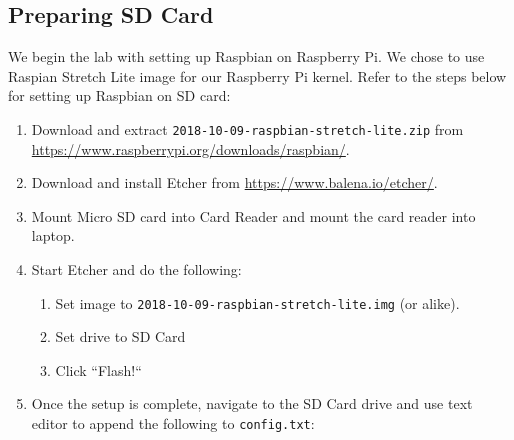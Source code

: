 \documentclass[onecolumn, draftclsnofoot, 10pt, compsoc]{IEEEtran}
\begin{document}
\subsection{Preparing SD Card}
We begin the lab with setting up Raspbian on Raspberry Pi. We chose to use Raspian Stretch Lite image for our Raspberry Pi kernel. Refer to the steps below for setting up Raspbian on SD card:
\begin{enumerate}
\item Download and extract \texttt{2018-10-09-raspbian-stretch-lite.zip} from \url{https://www.raspberrypi.org/downloads/raspbian/}.
\item Download and install Etcher from \url{https://www.balena.io/etcher/}.
\item Mount Micro SD card into Card Reader and mount the card reader into laptop.
\item Start Etcher and do the following:
    \begin{enumerate}
    \item Set image to \texttt{2018-10-09-raspbian-stretch-lite.img} (or alike).
    \item Set drive to SD Card
    \item Click ``Flash!``
    \end{enumerate}
\item Once the setup is complete, navigate to the SD Card drive and use text editor to append the following to \texttt{config.txt}:
\inputminted[breaklines]{bash}{cs2.sh}
\end{enumerate}
\end{document}
